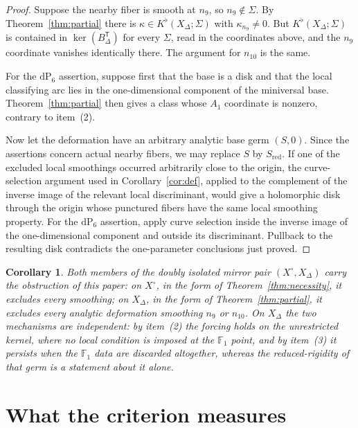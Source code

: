 \documentclass[11pt]{amsart}
\newtheorem{corollary}[theorem]{Corollary}
\theoremstyle{definition}
\theoremstyle{remark}
\theoremstyle{plain}
\newcommand{\dP}{\mathrm{dP}}
\begin{document}
\begin{proof}
Suppose the nearby fiber is smooth at $n_9$, so $n_9\notin\Sigma$.  By
Theorem~\ref{thm:partial} there is
$\kappa\in K^{\flat}(X_{\Delta};\Sigma)$ with $\kappa_{n_9}\neq0$.
But $K^{\flat}(X_{\Delta};\Sigma)$ is contained in
$\ker(B_{\Delta}^{\mathsf T})$ for every $\Sigma$, read in the
coordinates above, and the $n_9$ coordinate vanishes identically
there.  The argument for $n_{10}$ is the same.

For the $\dP_6$ assertion, suppose first that the base is a disk and
that the local classifying arc lies in the one-dimensional component of
the miniversal base.  Theorem~\ref{thm:partial} then gives a class whose
$A_1$ coordinate is nonzero, contrary to item~(2).

Now let the deformation have an arbitrary analytic base germ $(S,0)$.
Since the assertions concern actual nearby fibers, we may replace $S$
by $S_{\mathrm{red}}$.  If one of the excluded local smoothings occurred
arbitrarily close to the origin, the curve-selection argument used in
Corollary~\ref{cor:def}, applied to the complement of the inverse image
of the relevant local discriminant, would give a holomorphic disk
through the origin whose punctured fibers have the same local smoothing
property.  For the $\dP_6$ assertion, apply curve selection inside the
inverse image of the one-dimensional component and outside its
discriminant.  Pullback to the resulting disk contradicts the
one-parameter conclusions just proved.
\end{proof}

\begin{corollary}\label{cor:pair}
Both members of the doubly isolated mirror pair $(X^{\circ},X_{\Delta})$ carry the
obstruction of this paper: on $X^{\circ}$, in the form of
Theorem~\ref{thm:necessity}, it excludes every smoothing; on
$X_{\Delta}$, in the form of Theorem~\ref{thm:partial}, it excludes
every analytic deformation smoothing $n_9$ or $n_{10}$.  On
$X_{\Delta}$ the two mechanisms are independent: by item~(2) the
forcing holds on the unrestricted kernel, where no local condition is imposed
at the $\mathbb F_1$ point, and by item~(3) it persists when the $\mathbb F_1$
data are discarded altogether, whereas the reduced-rigidity of that germ
is a statement about it alone.
\end{corollary}


\section{What the criterion measures}\label{sec:measures}
\end{document}
